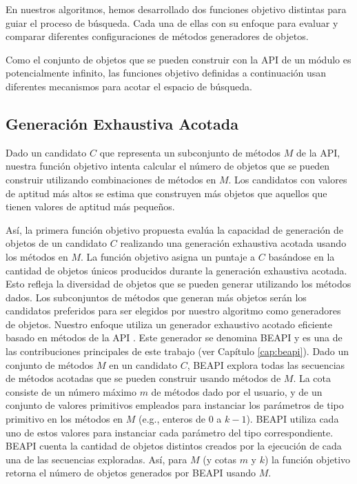 En nuestros algoritmos, hemos desarrollado dos funciones objetivo distintas para guiar el proceso de búsqueda. 
Cada una de ellas con su enfoque para evaluar y comparar diferentes configuraciones de métodos generadores de objetos.

Como el conjunto de objetos que se pueden construir con la API de un módulo es potencialmente infinito, las funciones objetivo definidas a continuación usan diferentes mecanismos para acotar el espacio de búsqueda.


\subsection{Generación Exhaustiva Acotada}
\label{sec:fitnessGE}

Dado un candidato $C$ que representa un subconjunto de métodos $M$ de la API, 
nuestra función objetivo intenta calcular el número de objetos que se pueden construir utilizando combinaciones de métodos en $M$. 
Los candidatos con valores de aptitud más altos se estima que construyen más objetos que aquellos que tienen valores de aptitud más pequeños.

Así, la primera función objetivo propuesta evalúa la capacidad de generación de objetos de un candidato $C$ realizando una generación exhaustiva acotada \cite{Politano20} usando los métodos en $M$. La función objetivo asigna un puntaje a $C$ basándose en la cantidad de objetos únicos producidos durante la generación exhaustiva acotada. Esto refleja la diversidad de objetos que se pueden generar utilizando los métodos dados. Los subconjuntos de métodos que generan más objetos serán los candidatos preferidos para ser elegidos por nuestro algoritmo como generadores de objetos.
Nuestro enfoque utiliza un generador exhaustivo acotado eficiente basado en métodos de la API \cite{Politano20}. Este generador se denomina BEAPI y es una de las contribuciones principales de este trabajo (ver Capítulo \ref{cap:beapi}).
Dado un conjunto de métodos $M$ en un candidato $C$, BEAPI explora todas las secuencias de métodos acotadas que se pueden construir usando métodos de $M$. La cota consiste de un número máximo $m$ de métodos dado por el usuario, y de un conjunto de valores primitivos empleados para instanciar los parámetros de tipo primitivo en los métodos en $M$ (e.g., enteros de \( 0 \) a \( k-1 \)).
BEAPI utiliza cada uno de estos valores para instanciar cada parámetro del tipo correspondiente. 
BEAPI cuenta la cantidad de objetos distintos creados por la ejecución de cada una de las secuencias exploradas. 
Así, para $M$ (y cotas $m$ y $k$) la función objetivo retorna el número de objetos generados por BEAPI usando $M$.

